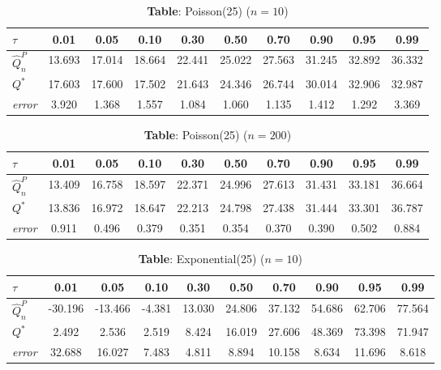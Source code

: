\begin{table}[H]
\centering
\caption{\textbf{Table}: Poisson(25) ($n=10$)}
\label{tab:poisson_n10}
\renewcommand{\arraystretch}{1.15}
\begin{tabular}{lccccccccc}
\toprule
$\tau$         & 0.01 & 0.05 & 0.10 & 0.30 & 0.50 & 0.70 & 0.90 & 0.95 & 0.99 \\ \midrule
$\hat{Q}_n^P$  & 13.693 & 17.014 & 18.664 & 22.441 & 25.022 & 27.563 & 31.245 & 32.892 & 36.332 \\
$Q^*$          & 17.603 & 17.600 & 17.502 & 21.643 & 24.346 & 26.744 & 30.014 & 32.906 & 32.987 \\
\textit{error} &  3.920 &  1.368 &  1.557 &  1.084 &  1.060 &  1.135 &  1.412 &  1.292 &  3.369 \\ \bottomrule
\end{tabular}
\end{table}

\begin{table}[H]
\centering
\caption{\textbf{Table}: Poisson(25) ($n=200$)}
\label{tab:poisson_n200}
\renewcommand{\arraystretch}{1.15}
\begin{tabular}{lccccccccc}
\toprule
$\tau$         & 0.01 & 0.05 & 0.10 & 0.30 & 0.50 & 0.70 & 0.90 & 0.95 & 0.99 \\ \midrule
$\hat{Q}_n^P$  & 13.409 & 16.758 & 18.597 & 22.371 & 24.996 & 27.613 & 31.431 & 33.181 & 36.664 \\
$Q^*$          & 13.836 & 16.972 & 18.647 & 22.213 & 24.798 & 27.438 & 31.444 & 33.301 & 36.787 \\
\textit{error} &  0.911 &  0.496 &  0.379 &  0.351 &  0.354 &  0.370 &  0.390 &  0.502 &  0.884 \\ \bottomrule
\end{tabular}
\end{table}

\begin{table}[H]
\centering
\caption{\textbf{Table}: Exponential(25) ($n=10$)}
\label{tab:exp_n10}
\renewcommand{\arraystretch}{1.15}
\begin{tabular}{lccccccccc}
\toprule
$\tau$         & 0.01  & 0.05  & 0.10  & 0.30  & 0.50  & 0.70  & 0.90  & 0.95  & 0.99 \\ \midrule
$\hat{Q}_n^P$  & -30.196 & -13.466 &  -4.381 &  13.030 &  24.806 &  37.132 &  54.686 &  62.706 &  77.564 \\
$Q^*$          &   2.492 &   2.536 &   2.519 &   8.424 &  16.019 &  27.606 &  48.369 &  73.398 &  71.947 \\
\textit{error} &  32.688 &  16.027 &   7.483 &   4.811 &   8.894 &  10.158 &   8.634 &  11.696 &   8.618 \\ \bottomrule
\end{tabular}
\end{table}



